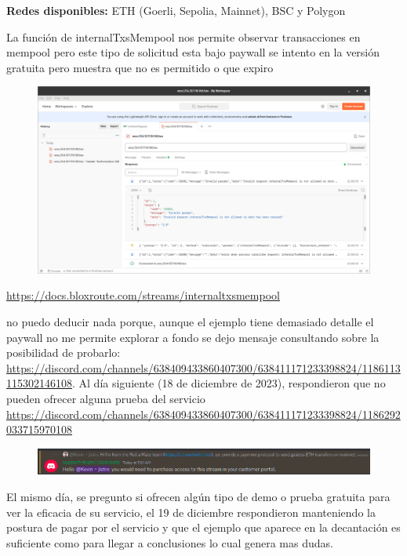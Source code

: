 \textbf{Redes disponibles:} ETH (Goerli, Sepolia, Mainnet), BSC y Polygon

\medskip

La función de internalTxsMempool nos permite observar transacciones en mempool pero este tipo de solicitud esta bajo paywall se intento en la versión gratuita pero muestra que no es permitido o que expiro

\begin{figure}
    \centering
    \includegraphics[width=1\linewidth]{img//screenshots/Screenshot from 2023-12-15 22-09-10.png}
\end{figure}

\url{https://docs.bloxroute.com/streams/internaltxsmempool}

no puedo deducir nada porque, aunque el ejemplo tiene demasiado detalle el paywall no me permite explorar a fondo se dejo mensaje consultando sobre la posibilidad de probarlo: \url{https://discord.com/channels/638409433860407300/638411171233398824/1186113115302146108}. Al día siguiente (18 de diciembre de 2023), respondieron que no pueden ofrecer alguna prueba del servicio \url{https://discord.com/channels/638409433860407300/638411171233398824/1186292033715970108} 

\begin{figure}
    \centering
    \includegraphics[width=1\linewidth]{Screenshot from 2023-12-18 13-30-41.png}   
\end{figure}
El mismo día, se pregunto si ofrecen algún tipo de demo o prueba gratuita para ver la eficacia de su servicio, el 19 de diciembre respondieron manteniendo la postura de pagar por el servicio y que el ejemplo que aparece en la decantación es suficiente como para llegar a conclusiones lo cual genera mas dudas.

